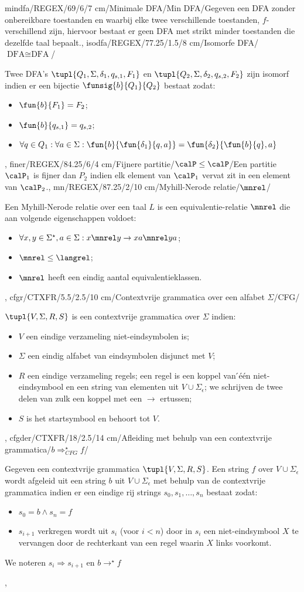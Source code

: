 mindfa/REGEX/69/6/7 cm/{Minimale DFA}/Min DFA/{Gegeven een DFA zonder onbereikbare toestanden en waarbij elke twee verschillende toestanden, $f$-verschillend zijn, hiervoor bestaat er geen DFA met strikt minder toestanden die dezelfde taal bepaalt.},
isodfa/REGEX/77.25/1.5/8 cm/Isomorfe DFA/{$\mbox{DFA}\cong\mbox{DFA}$}/{Twee DFA's $\tupl{Q_1,\Sigma,\delta_1,q_{s,1},F_1}$ en $\tupl{Q_2,\Sigma,\delta_2,q_{s,2},F_2}$ zijn isomorf indien er een bijectie $\funsig{b}{Q_1}{Q_2}$ bestaat zodat:\begin{itemize}\item $\fun{b}{F_1}=F_2$;\item $\fun{b}{q_{s,1}}=q_{s,2}$;\item $\forall q\in Q_1:\forall a\in\Sigma:\fun{b}{\fun{\delta_1}{q,a}}=\fun{\delta_2}{\fun{b}{q},a}$\end{itemize}},
finer/REGEX/84.25/6/4 cm/Fijnere partitie/{$\calP\leq\calP$}/{Een partitie $\calP_1$ is fijner dan $P_2$ indien elk element van $\calP_1$ vervat zit in een element van $\calP_2$.},
mn/REGEX/87.25/2/10 cm/Myhill-Nerode relatie/$\mnrel$/{Een Myhill-Nerode relatie over een taal $L$ is een equivalentie-relatie $\mnrel$ die aan volgende eigenschappen voldoet:\begin{itemize}\item $\forall x,y\in\Sigma^{\star},a\in\Sigma:x\mnrel y\rightarrow xa\mnrel ya$;\item $\mnrel\leq\langrel$;\item $\mnrel$ heeft een eindig aantal equivalentieklassen.\end{itemize}},
cfgr/CTXFR/5.5/2.5/10 cm/Contextvrije grammatica over een alfabet $\Sigma$/CFG/{$\tupl{V,\Sigma,R,S}$ is een contextvrije grammatica over $\Sigma$ indien:\begin{itemize}
 \item $V$ een eindige verzameling niet-eindsymbolen is;
 \item $\Sigma$ een eindig alfabet van eindsymbolen disjunct met $V$;
 \item $R$ een eindige verzameling regels; een regel is een koppel van  ́\'e\'en niet-eindsymbool en een string van elementen uit $V\cup\Sigma_{\epsilon}$; we schrijven de twee delen van zulk een koppel met een $\rightarrow$ ertussen;
 \item $S$ is het startsymbool en behoort tot $V$.
\end{itemize}},
cfgder/CTXFR/18/2.5/14 cm/Afleiding met behulp van een contextvrije grammatica/$b\Rightarrow_{CFG}^{\star}f$/{Gegeven een contextvrije grammatica $\tupl{V,\Sigma,R,S}$. Een string $f$ over $V\cup\Sigma_{\epsilon}$ wordt afgeleid uit een string $b$ uit $V\cup\Sigma_{\epsilon}$ met behulp van de contextvrije grammatica indien er een eindige rij strings $s_0,s_1,\ldots,s_n$ bestaat zodat:\begin{itemize}
 \item $s_0=b\wedge s_n=f$
 \item $s_{i+1}$ verkregen wordt uit $s_i$ (voor $i<n$) door in $s_i$ een niet-eindsymbool $X$ te vervangen door de rechterkant van een regel waarin $X$ links voorkomt.
\end{itemize}
We noteren $s_i\Rightarrow s_{i+1}$ en $b\rightarrow^{\star}f$},
